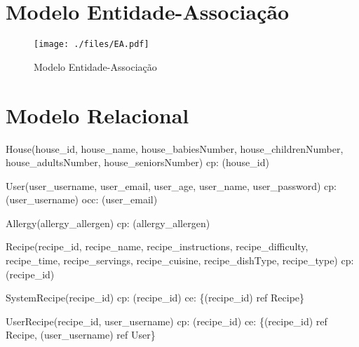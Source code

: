 \section{Modelo Entidade-Associação}\label{sec31}

\begin{figure}
	\centering
	\texttt{[image: ./files/EA.pdf]}
	\caption{Modelo Entidade-Associação}
	\label{modelo-ea}
\end{figure}

\section{Modelo Relacional}\label{sec32}

{\parindent 0pt
	\begin{description}
		\item House(house\_id, house\_name, house\_babiesNumber, house\_childrenNumber, house\_adultsNumber, house\_seniorsNumber) \newline
		\acrshort{cp}: (house\_id) 
		
		\item User(user\_username, user\_email, user\_age, user\_name, user\_password) \newline
		\acrshort{cp}: (user\_username)  \newline
		\acrshort{occ}: (user\_email)
		
		\item Allergy(allergy\_allergen) \newline
		\acrshort{cp}: (allergy\_allergen) 
		
		\item Recipe(recipe\_id, recipe\_name, recipe\_instructions, recipe\_difficulty, recipe\_time, recipe\_servings, recipe\_cuisine, recipe\_dishType, recipe\_type) \newline
		\acrshort{cp}: (recipe\_id) 
		
		\item SystemRecipe(recipe\_id) \newline
		\acrshort{cp}: (recipe\_id) \newline
		\acrshort{ce}: \{(recipe\_id) ref Recipe\}
		
		\item UserRecipe(recipe\_id, user\_username) \newline
		\acrshort{cp}: (recipe\_id) \newline
		\acrshort{ce}: \{(recipe\_id) ref Recipe, (user\_username) ref User\}
		

\end{description}}
